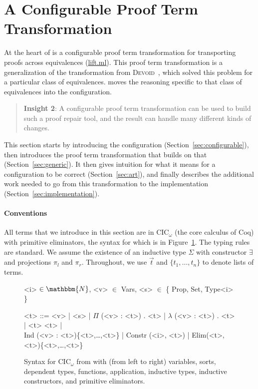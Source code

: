 \section{A Configurable Proof Term Transformation}
\label{sec:key2}

At the heart of \toolname is a configurable proof term transformation for transporting
proofs across equivalences (\href{https://github.com/uwplse/pumpkin-pi/blob/master/plugin/src/automation/lift/lift.ml}{lift.ml}). 
This proof term transformation is a generalization of the transformation from 
\textsc{Devoid}~\cite{Ringer2019}, which solved this problem for a particular class of equivalences.
\toolname moves the reasoning specific to that class of equivalences into the configuration. 

\begin{quote}
\textbf{Insight 2}:
A configurable proof term transformation can be used to build such a proof repair tool,
and the result can handle many different kinds of changes.
\end{quote}

This section starts by introducing the configuration (Section~\ref{sec:configurable}),
then introduces the proof term transformation that builds on that (Section~\ref{sec:generic}).
It then gives intuition for what it means for a configuration to be correct (Section~\ref{sec:art}),
and finally describes the additional work needed to go from this transformation to the implementation (Section~\ref{sec:implementation}). 

\paragraph{Conventions}
All terms that we introduce in this section are in CIC$_{\omega}$ (the core calculus of Coq) with primitive eliminators,
the syntax for which is in Figure~\ref{fig:syntax}.
The typing rules are standard.
We assume the existence of an inductive type $\Sigma$ with constructor $\exists$ and projections $\pi_l$ and $\pi_r$.
Throughout, we use $\vec{t}$ and $\{t_1, \ldots, t_n\}$ to denote lists of terms.

\begin{figure}
\small
\begin{grammar}
<i> $\in \mathbbm{N}$, <v> $\in$ Vars, <s> $\in$ \{ Prop, Set, Type<i> \}

<t> ::= <v> | <s> | $\Pi$ (<v> : <t>) . <t> | $\lambda$ (<v> : <t>) . <t> | <t> <t> | \\ 
Ind (<v> : <t>)\{<t>,\ldots,<t>\} | Constr (<i>, <t>) | Elim(<t>, <t>)\{<t>,\ldots,<t>\}
\end{grammar}
\vspace{-0.3cm}
\caption{Syntax for CIC$_\omega$ from \citet{Timany2015FirstST} with (from left to right) variables, sorts, dependent types, functions, application, inductive types, inductive constructors, and primitive eliminators.}
\label{fig:syntax}
\end{figure}

